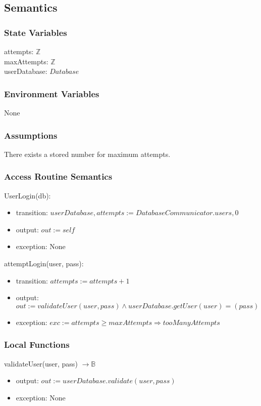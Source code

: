 \documentclass[12pt, titlepage]{article}
\begin{document}
\subsection{Semantics}

\subsubsection{State Variables}
attempts: $\mathbb{Z}$\\
maxAttempts: $\mathbb{Z}$\\
userDatabase: $Database$ \\
\subsubsection{Environment Variables}
None
\subsubsection{Assumptions}
There exists a stored number for maximum attempts.
\subsubsection{Access Routine Semantics}

\noindent UserLogin(db):
\begin{itemize}
	\item transition: $userDatabase, attempts := DatabaseCommunicator.users, 0$
	\item output: $out := self$
	\item exception: None
\end{itemize}

\noindent attemptLogin(user, pass):
\begin{itemize}
	\item transition: $attempts := attempts + 1$
	\item output: $out := validateUser(user, pass) \land userDatabase.getUser(user) = (pass)$
	\item exception: $exc := attempts \ge maxAttempts \Rightarrow tooManyAttempts$
\end{itemize}

\subsubsection{Local Functions}

\noindent validateUser(user, pass) $\rightarrow \mathbb{B}$
\begin{itemize}
	\item output: $out := userDatabase.validate(user, pass)$
	\item exception: None
\end{itemize}
\newpage
\end{document}
